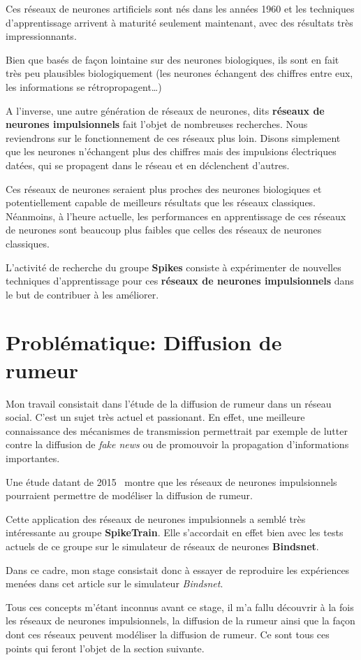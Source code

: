 Ces réseaux de neurones artificiels sont nés dans les années 1960 et les
techniques d'apprentissage arrivent à maturité seulement maintenant,
avec des résultats très impressionnants.

Bien que basés de façon lointaine sur des neurones biologiques, ils sont
en fait très peu plausibles biologiquement (les neurones échangent des
chiffres entre eux, les informations se rétropropagent\ldots{})

A l'inverse, une autre génération de réseaux de neurones, dits
\textbf{réseaux de neurones impulsionnels} fait l'objet de nombreuses
recherches. Nous reviendrons sur le fonctionnement de ces réseaux plus
loin. Disons simplement que les neurones n'échangent plus des chiffres
mais des impulsions électriques datées, qui se propagent dans le réseau
et en déclenchent d'autres.

Ces réseaux de neurones seraient plus proches des neurones biologiques
et potentiellement capable de meilleurs résultats que les réseaux
classiques. Néanmoins, à l'heure actuelle, les performances en
apprentissage de ces réseaux de neurones sont beaucoup plus faibles que
celles des réseaux de neurones classiques.

L'activité de recherche du groupe \textbf{Spikes} consiste à
expérimenter de nouvelles techniques d'apprentissage pour ces
\textbf{réseaux de neurones impulsionnels} dans le but de contribuer à
les améliorer.

\hypertarget{problematique}{%
\section{Problématique: Diffusion de rumeur}\label{problematique}}

Mon travail consistait dans l'étude de la diffusion de rumeur dans un réseau social.
C'est un sujet très actuel et passionant. En effet,
une meilleure connaissance des mécanismes de transmission permettrait par exemple de lutter contre la diffusion de \textit{fake news} ou de promouvoir la propagation d'informations importantes.

Une étude datant de 2015~\cite{Lympero} montre que les réseaux de neurones impulsionnels pourraient permettre de modéliser la diffusion de rumeur.

Cette application des réseaux de neurones impulsionnels a semblé très intéressante au groupe \textbf{SpikeTrain}. Elle s'accordait en effet bien avec les tests actuels de ce groupe sur le simulateur de réseaux de neurones \textbf{Bindsnet}.

Dans ce cadre, mon stage consistait donc à essayer de reproduire les expériences menées dans cet article sur le simulateur \textit{Bindsnet}.

Tous ces concepts m'étant inconnus avant ce stage, il m'a fallu découvrir à la fois les réseaux de neurones impulsionnels, la diffusion de la rumeur ainsi que la façon dont ces réseaux peuvent modéliser la diffusion de rumeur. Ce sont tous ces points qui feront l'objet de la section suivante.

